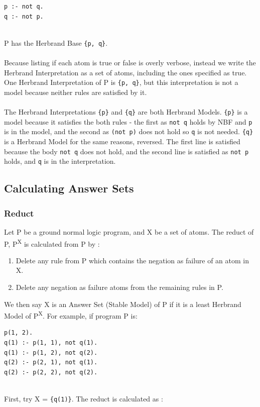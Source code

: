 \begin{lstlisting}
p :- not q.
q :- not p.
\end{lstlisting}
\mbox{}\\
P has the Herbrand Base \lstinline!{p, q}!. \\ \\ 
Because listing if each atom is true or false is overly verbose, instead we write the Herbrand Interpretation as a set of atoms, including the ones specified as true. One Herbrand Interpretation of P is \lstinline!{p, q}!, but this interpretation is not a model because neither rules are satisfied by it. \\ \\
The Herbrand Interpretations \lstinline!{p}! and \lstinline!{q}! are both Herbrand Models. \lstinline!{p}! is a model because it satisfies the both rules - the first as \lstinline!not q! holds by NBF and \lstinline!p! is in the model, and the second as \lstinline!(not p)! does not hold so \lstinline!q! is not needed. \lstinline!{q}! is a Herbrand Model for the same reasons, reversed. The first line is satisfied because the body \lstinline!not q! does not hold, and the second line is satisfied as \lstinline!not p! holds, and \lstinline!q! is in the interpretation.

\subsection{Calculating Answer Sets}

\subsubsection{Reduct}

Let P be a ground normal logic program, and X be a set of atoms. The reduct \cite{Law2015} of P, P\textsuperscript{X} is calculated from P by :

\begin{enumerate}
\item Delete any rule from P which contains the negation as failure of an atom in X.
\item Delete any negation as failure atoms from the remaining rules in P.
\end{enumerate}
We then say X is an Answer Set (Stable Model) of P if it is a least Herbrand Model of  P\textsuperscript{X}. For example, if program P is:\\

\begin{lstlisting}
p(1, 2).
q(1) :- p(1, 1), not q(1).
q(1) :- p(1, 2), not q(2).
q(2) :- p(2, 1), not q(1).
q(2) :- p(2, 2), not q(2).
\end{lstlisting}
\mbox{}\\
First, try X = \lstinline!{q(1)}!. The reduct is calculated as : \\

